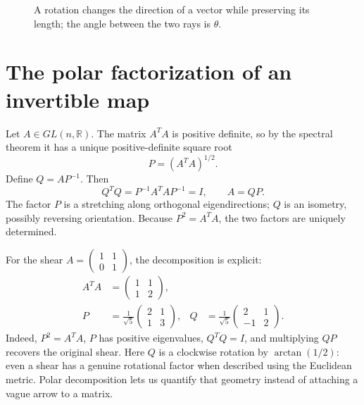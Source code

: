 \begin{figure}[H]
 \centering
 \caption{A rotation changes the direction of a vector while preserving its length; the angle between the two rays is $\theta$.}
\end{figure}

\section{The polar factorization of an invertible map}

Let \(A\in GL(n,\mathbb R)\). The matrix \(A^TA\) is positive definite, so by the spectral theorem it has a unique positive-definite square root
\[
 P=(A^TA)^{1/2}.
\]
Define \(Q=AP^{-1}\). Then
\[
 Q^TQ=P^{-1}A^TAP^{-1}=I,
 \qquad \boxed{A=QP}.
\]
The factor \(P\) is a stretching along orthogonal eigendirections; \(Q\) is an isometry, possibly reversing orientation. Because \(P^2=A^TA\), the two factors are uniquely determined.

For the shear \(A=\left(\begin{smallmatrix}1&1\\0&1\end{smallmatrix}\right)\), the decomposition is explicit:
\[
 \begin{aligned}
 A^TA&=\begin{pmatrix}1&1\\1&2\end{pmatrix},\\
 P&=\frac1{\sqrt5}\begin{pmatrix}2&1\\1&3\end{pmatrix},
 &Q&=\frac1{\sqrt5}\begin{pmatrix}2&1\\-1&2\end{pmatrix}.
 \end{aligned}
\]
Indeed, \(P^2=A^TA\), \(P\) has positive eigenvalues, \(Q^TQ=I\), and multiplying \(QP\) recovers the original shear. Here
\(Q\) is a clockwise rotation by \(\arctan(1/2)\): even a shear has a genuine rotational factor when described using the Euclidean metric. Polar decomposition lets us quantify that geometry instead of attaching a vague arrow to a matrix.

